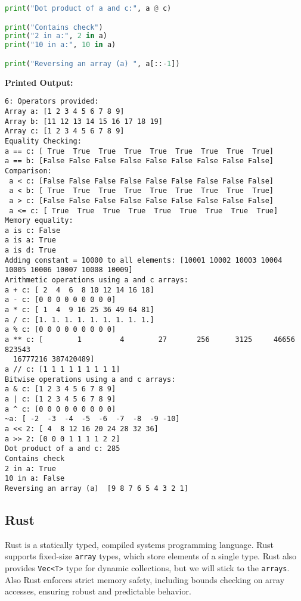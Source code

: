 \documentclass{article}
\begin{document}
\begin{itemize}
\begin{lstlisting}[language=Python]
print("Dot product of a and c:", a @ c) 

print("Contains check")
print("2 in a:", 2 in a)
print("10 in a:", 10 in a)         

print("Reversing an array (a) ", a[::-1]) 
\end{lstlisting}
\textbf{Printed Output:}
\begin{verbatim}
6: Operators provided:
Array a: [1 2 3 4 5 6 7 8 9]
Array b: [11 12 13 14 15 16 17 18 19]
Array c: [1 2 3 4 5 6 7 8 9]
Equality Checking:
a == c: [ True  True  True  True  True  True  True  True  True]
a == b: [False False False False False False False False False]
Comparison:
 a < c: [False False False False False False False False False]
 a < b: [ True  True  True  True  True  True  True  True  True]
 a > c: [False False False False False False False False False]
 a <= c: [ True  True  True  True  True  True  True  True  True]
Memory equality:
a is c: False
a is a: True
a is d: True
Adding constant = 10000 to all elements: [10001 10002 10003 10004 10005 10006 10007 10008 10009]
Arithmetic operations using a and c arrays:
a + c: [ 2  4  6  8 10 12 14 16 18]
a - c: [0 0 0 0 0 0 0 0 0]
a * c: [ 1  4  9 16 25 36 49 64 81]
a / c: [1. 1. 1. 1. 1. 1. 1. 1. 1.]
a % c: [0 0 0 0 0 0 0 0 0]
a ** c: [        1         4        27       256      3125     46656    823543
  16777216 387420489]
a // c: [1 1 1 1 1 1 1 1 1]
Bitwise operations using a and c arrays:
a & c: [1 2 3 4 5 6 7 8 9]
a | c: [1 2 3 4 5 6 7 8 9]
a ^ c: [0 0 0 0 0 0 0 0 0]
~a: [ -2  -3  -4  -5  -6  -7  -8  -9 -10]
a << 2: [ 4  8 12 16 20 24 28 32 36]
a >> 2: [0 0 0 1 1 1 1 2 2]
Dot product of a and c: 285
Contains check
2 in a: True
10 in a: False
Reversing an array (a)  [9 8 7 6 5 4 3 2 1]
\end{verbatim}
\end{itemize}
\newpage








\subsection{Rust}
Rust is a statically typed, compiled systems programming language. Rust supports fixed-size \texttt{array} types, which store elements of a single type. Rust also provides \texttt{Vec<T>} type for dynamic collections, but we will stick to the \texttt{arrays}. Also Rust enforces strict memory safety, including bounds checking on array accesses, ensuring robust and predictable behavior.
\end{document}
